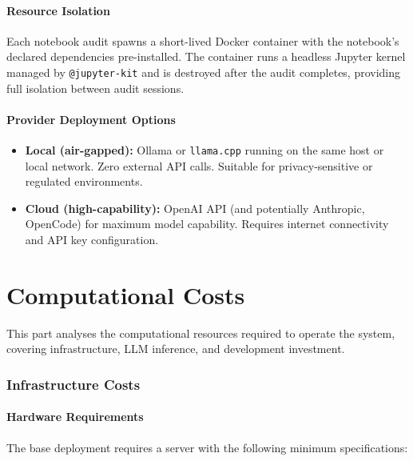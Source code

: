 \documentclass[11pt, a4paper]{article}
\begin{document}
\subsection*{Resource Isolation}

Each notebook audit spawns a short-lived Docker container with the notebook's
declared dependencies pre-installed. The container runs a headless Jupyter
kernel managed by \texttt{@jupyter-kit} and is destroyed after the audit
completes, providing full isolation between audit sessions.

\subsection*{Provider Deployment Options}

\begin{itemize}
  \item \textbf{Local (air-gapped):} Ollama or \texttt{llama.cpp} running on
    the same host or local network. Zero external API calls. Suitable for
    privacy-sensitive or regulated environments.

  \item \textbf{Cloud (high-capability):} OpenAI API (and potentially
    Anthropic, OpenCode) for maximum model capability. Requires internet
    connectivity and API key configuration.
\end{itemize}

\part{Computational Costs}

This part analyses the computational resources required to operate the
system, covering infrastructure, LLM inference, and development investment.

\section{Infrastructure Costs}

\subsection*{Hardware Requirements}

The base deployment requires a server with the following minimum
specifications:
\end{document}
